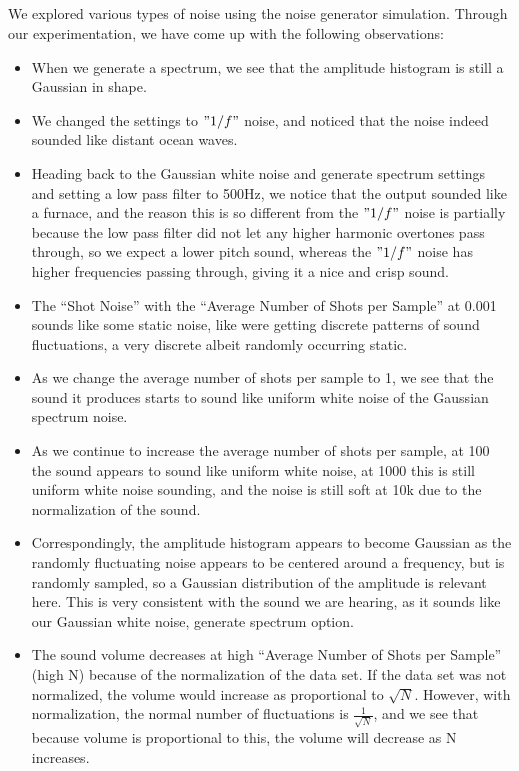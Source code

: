 \documentclass{article}
\begin{document}
\subsection{}
    We explored various types of noise using the noise generator simulation. Through our experimentation, we have come up with the following observations:
    \begin{itemize}
        \item When we generate a spectrum, we see that the amplitude histogram is still a Gaussian in shape.
        \item We changed the settings to $"1/f"$ noise, and noticed that the noise indeed sounded like distant ocean waves.
        \item Heading back to the Gaussian white noise and generate spectrum settings and setting a low pass filter to 500Hz, we notice that the output sounded like a furnace, and the reason this is so different from the $"1/f"$ noise is partially because the low pass filter did not let any higher harmonic overtones pass through, so we expect a lower pitch sound, whereas the $"1/f"$ noise has higher frequencies passing through, giving it a nice and crisp sound.
        \item The “Shot Noise” with the “Average Number of Shots per Sample” at 0.001 sounds like some static noise, like were getting discrete patterns of sound fluctuations, a very discrete albeit randomly occurring static.
        \item As we change the average number of shots per sample to 1, we see that the sound it produces starts to sound like uniform white noise of the Gaussian spectrum noise. 
        \item As we continue to increase the average number of shots per sample, at 100 the sound appears to sound like uniform white noise, at 1000 this is still uniform white noise sounding, and the noise is still soft at 10k due to the normalization of the sound. 
        \item Correspondingly, the amplitude histogram appears to become Gaussian as the randomly fluctuating noise appears to be centered around a frequency, but is randomly sampled, so a Gaussian distribution of the amplitude is relevant here. This is very consistent with the sound we are hearing, as it sounds like our Gaussian white noise, generate spectrum option.
        \item The sound volume decreases at high “Average Number of Shots per Sample” (high N) because of the normalization of the data set. If the data set was not normalized, the volume would increase as proportional to $\sqrt{N}$. However, with normalization, the normal number of fluctuations is $\frac{1}{\sqrt{N}}$, and we see that because volume is proportional to this, the volume will decrease as N increases.

\end{itemize}
\end{document}
